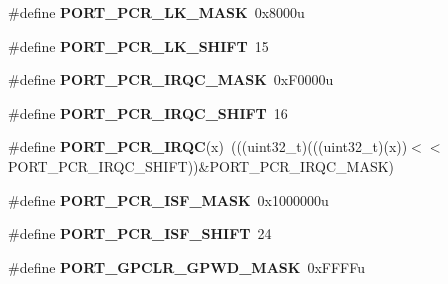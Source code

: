 \begin{DoxyCompactItemize}
\item 
\#define {\bfseries P\+O\+R\+T\+\_\+\+P\+C\+R\+\_\+\+L\+K\+\_\+\+M\+A\+SK}~0x8000u\hypertarget{group__PORT__Register__Masks_ga671e65e4960f3b103af68881ae99d85a}{}\label{group__PORT__Register__Masks_ga671e65e4960f3b103af68881ae99d85a}

\item 
\#define {\bfseries P\+O\+R\+T\+\_\+\+P\+C\+R\+\_\+\+L\+K\+\_\+\+S\+H\+I\+FT}~15\hypertarget{group__PORT__Register__Masks_ga72ad78bf008f1968310a8abcd09b29ea}{}\label{group__PORT__Register__Masks_ga72ad78bf008f1968310a8abcd09b29ea}

\item 
\#define {\bfseries P\+O\+R\+T\+\_\+\+P\+C\+R\+\_\+\+I\+R\+Q\+C\+\_\+\+M\+A\+SK}~0x\+F0000u\hypertarget{group__PORT__Register__Masks_gabaef70d886fda0a7da8e862308bf5909}{}\label{group__PORT__Register__Masks_gabaef70d886fda0a7da8e862308bf5909}

\item 
\#define {\bfseries P\+O\+R\+T\+\_\+\+P\+C\+R\+\_\+\+I\+R\+Q\+C\+\_\+\+S\+H\+I\+FT}~16\hypertarget{group__PORT__Register__Masks_ga0bda43cd85ca4d5df17f12a193937d81}{}\label{group__PORT__Register__Masks_ga0bda43cd85ca4d5df17f12a193937d81}

\item 
\#define {\bfseries P\+O\+R\+T\+\_\+\+P\+C\+R\+\_\+\+I\+R\+QC}(x)~(((uint32\+\_\+t)(((uint32\+\_\+t)(x))$<$$<$P\+O\+R\+T\+\_\+\+P\+C\+R\+\_\+\+I\+R\+Q\+C\+\_\+\+S\+H\+I\+FT))\&P\+O\+R\+T\+\_\+\+P\+C\+R\+\_\+\+I\+R\+Q\+C\+\_\+\+M\+A\+SK)\hypertarget{group__PORT__Register__Masks_ga7e6b6f68db9e76cf6fa34774c9b9b8f9}{}\label{group__PORT__Register__Masks_ga7e6b6f68db9e76cf6fa34774c9b9b8f9}

\item 
\#define {\bfseries P\+O\+R\+T\+\_\+\+P\+C\+R\+\_\+\+I\+S\+F\+\_\+\+M\+A\+SK}~0x1000000u\hypertarget{group__PORT__Register__Masks_ga154d9308c2ab5b6a78ab04d9f3b08879}{}\label{group__PORT__Register__Masks_ga154d9308c2ab5b6a78ab04d9f3b08879}

\item 
\#define {\bfseries P\+O\+R\+T\+\_\+\+P\+C\+R\+\_\+\+I\+S\+F\+\_\+\+S\+H\+I\+FT}~24\hypertarget{group__PORT__Register__Masks_ga5fbf95753704fb1d71da88299c11105e}{}\label{group__PORT__Register__Masks_ga5fbf95753704fb1d71da88299c11105e}

\item 
\#define {\bfseries P\+O\+R\+T\+\_\+\+G\+P\+C\+L\+R\+\_\+\+G\+P\+W\+D\+\_\+\+M\+A\+SK}~0x\+F\+F\+F\+Fu\hypertarget{group__PORT__Register__Masks_gaa7e4a890e9d09d85279889ce3ecb0044}{}\label{group__PORT__Register__Masks_gaa7e4a890e9d09d85279889ce3ecb0044}


\end{DoxyCompactItemize}
